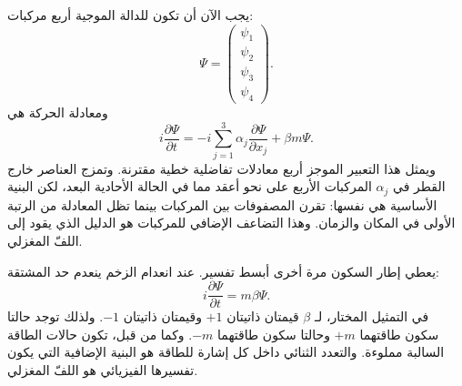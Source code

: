 يجب الآن أن تكون للدالة الموجية أربع مركبات:
\begin{equation}
\Psi=
\begin{pmatrix}
\psi_1\\
\psi_2\\
\psi_3\\
\psi_4
\end{pmatrix}.
\end{equation}
ومعادلة الحركة هي
\begin{equation}
i\frac{\partial\Psi}{\partial t}
=
-i\sum_{j=1}^{3}\alpha_j
\frac{\partial\Psi}{\partial x_j}
+\beta m\Psi.
\end{equation}
ويمثل هذا التعبير الموجز أربع معادلات تفاضلية خطية مقترنة. وتمزج العناصر خارج القطر في \(\alpha_j\) المركبات الأربع على نحو أعقد مما في الحالة الأحادية البعد، لكن البنية الأساسية هي نفسها: تقرن المصفوفات بين المركبات بينما تظل المعادلة من الرتبة الأولى في المكان والزمان. وهذا التضاعف الإضافي للمركبات هو الدليل الذي يقود إلى اللفّ المغزلي.

\begin{classroomqa}
\end{classroomqa}

يعطي إطار السكون مرة أخرى أبسط تفسير. عند انعدام الزخم ينعدم حد المشتقة:
\begin{equation}
i\frac{\partial\Psi}{\partial t}=m\beta\Psi.
\end{equation}
في التمثيل المختار، لـ \(\beta\) قيمتان ذاتيتان \(+1\) وقيمتان ذاتيتان \(-1\). ولذلك توجد حالتا سكون طاقتهما \(+m\) وحالتا سكون طاقتهما \(-m\). وكما من قبل، تكون حالات الطاقة السالبة مملوءة. والتعدد الثنائي داخل كل إشارة للطاقة هو البنية الإضافية التي يكون تفسيرها الفيزيائي هو اللفّ المغزلي.

\begin{classroomqa}
\end{classroomqa}

\begin{classroomqa}
\end{classroomqa}

